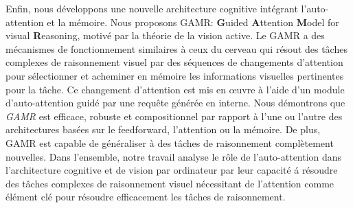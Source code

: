 Enfin, nous d\'eveloppons une nouvelle architecture cognitive int\'egrant l'auto-attention et la m\'emoire. Nous proposons GAMR: \textbf{G}uided \textbf{A}ttention \textbf{M}odel for visual \textbf{R}easoning, motiv\'e par la th\'eorie de la vision active. Le GAMR a des m\'ecanismes de fonctionnement similaires \`a ceux du cerveau qui r\'esout des tâches complexes de raisonnement visuel par des s\'equences de changements d'attention pour s\'electionner et acheminer en m\'emoire les informations visuelles pertinentes pour la tâche. Ce changement d'attention est mis en œuvre \`a l'aide d'un module d'auto-attention guid\'e par une requête g\'en\'er\'ee en interne. Nous d\'emontrons que \textit{GAMR} est efficace, robuste et compositionnel par rapport \`a l'une ou l'autre des architectures bas\'ees sur le feedforward, l'attention ou la m\'emoire. De plus, GAMR est capable de g\'en\'eraliser \`a des tâches de raisonnement complètement nouvelles. Dans l'ensemble, notre travail analyse le rôle de l'auto-attention dans l'architecture cognitive et de vision par ordinateur par leur capacit\'e \'a r\'esoudre des tâches complexes de raisonnement visuel n\'ecessitant de l'attention comme \'el\'ement cl\'e pour r\'esoudre efficacement les tâches de raisonnement.